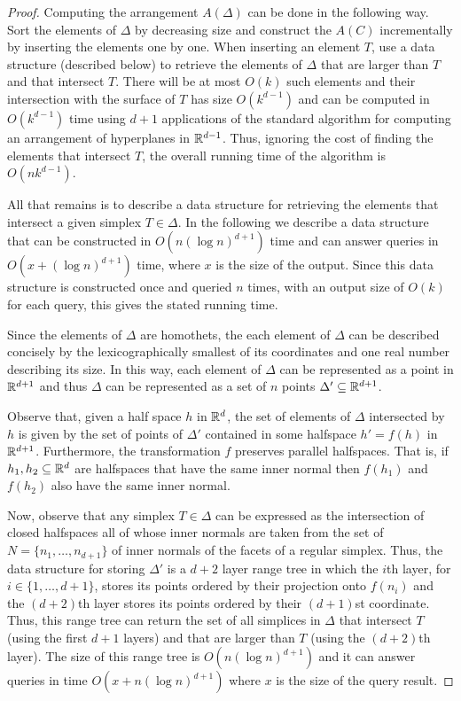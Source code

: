 \documentclass[lotsofwhite]{patmorin}
\begin{document}
\begin{proof}
Computing the arrangement $A(\Delta)$ can be done in the following way.
Sort the elements of $\Delta$ by decreasing size and construct the $A(C)$
incrementally by inserting the elements one by one.  When inserting an
element $T$, use a data structure (described below) to retrieve the
elements of $\Delta$ that are larger than $T$ and that intersect $T$.
There will be at most $O(k)$ such elements and their intersection with the
surface of $T$ has size $O(k^{d-1})$ and can be computed in $O(k^{d-1})$
time using $d+1$ applications of the standard algorithm for computing an
arrangement of hyperplanes in $\mathbb{R}^{d-1}$.  Thus, ignoring the cost of
finding the elements that intersect $T$, the overall running time of the
algorithm is $O(nk^{d-1})$.

All that remains is to describe a data structure for retrieving the
elements that intersect a given simplex $T\in\Delta$.  In the following we
describe a data structure that can be constructed in $O(n(\log n)^{d+1})$
time and can answer queries in $O(x + (\log n)^{d+1})$ time, where $x$ is
the size of the output.  Since this data structure is constructed once and
queried $n$ times, with an output size of $O(k)$ for each query, this gives
the stated running time.

Since the elements of $\Delta$ are homothets, the each element of $\Delta$
can be described concisely by the lexicographically smallest of its
coordinates and one real number describing its size. In this way, each
element of $\Delta$ can be represented as a point in $\mathbb{R}^{d+1}$ and thus
$\Delta$ can be represented as a set of $n$ points
$\Delta'\subseteq\mathbb{R}^{d+1}$.  

Observe that, given a half space $h$ in $\mathbb{R}^d$, the set of elements of
$\Delta$ intersected by $h$ is given by the set of points of $\Delta'$
contained in some halfspace $h'=f(h)$ in $\mathbb{R}^{d+1}$.  Furthermore, the
transformation $f$ preserves parallel halfspaces.  That is, if
$h_1,h_2\subseteq{\mathbb{R}^d}$ are halfspaces that have the same inner normal
then $f(h_1)$ and $f(h_2)$ also have the same inner normal.

Now, observe that any simplex $T\in\Delta$ can be expressed as the
intersection of closed halfspaces all of whose inner normals are taken from
the set of $N=\{n_1,\ldots,n_{d+1}\}$ of inner normals of the facets of a
regular simplex.  Thus, the data structure for storing $\Delta'$ is a $d+2$
layer range tree \cite{bsXX} in which the $i$th layer, for
$i\in\{1,\ldots,d+1\}$, stores its points ordered by their projection onto
$f(n_i)$ and the $(d+2)$th layer stores its points ordered by their
$(d+1)$st coordinate.   Thus, this range tree can return the set of all
simplices in $\Delta$ that intersect $T$ (using the first $d+1$ layers) and
that are larger than $T$ (using the $(d+2)$th layer). The size of this
range tree is $O(n(\log n)^{d+1})$ and it can answer queries in time
$O(x+n(\log n)^{d+1})$ where $x$ is the size of the query result.
\end{proof}
\end{document}
